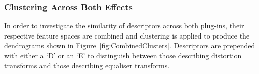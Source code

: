 		\subsubsection*{Clustering Across Both Effects}
			In order to investigate the similarity of descriptors across both plug-ins, their respective
			feature spaces are combined and clustering is applied to produce the dendrograms shown in
			Figure~\ref{fig:CombinedClusters}. Descriptors are prepended with either a `D' or an `E' to
			distinguish between those describing distortion transforms and those describing equaliser
			transforms.

			\begin{figure}[h!]
				\centering
\end{figure}
